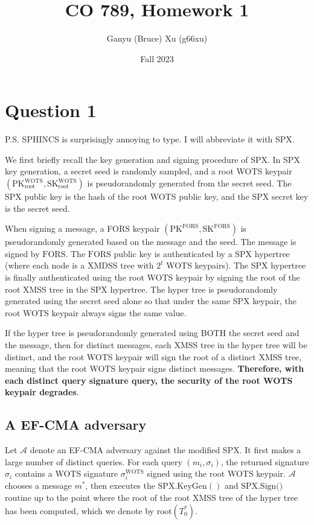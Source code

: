 \documentclass{article}
\title{CO 789, Homework 1}
\author{Ganyu (Bruce) Xu (g66xu)}
\date{Fall 2023}
\begin{document}

\section*{Question 1}
P.S. SPHINCS is surprisingly annoying to type. I will abbreviate it with SPX.

We first briefly recall the key generation and signing procedure of SPX. In SPX key generation, a secret seed is randomly sampled, and a root WOTS keypair $(\text{PK}^\text{WOTS}_\text{root}, \text{SK}^\text{WOTS}_\text{root})$ is pseudorandomly generated from the secret seed. The SPX public key is the hash of the root WOTS public key, and the SPX secret key is the secret seed.

When signing a message, a FORS keypair $(\text{PK}^\text{FORS}, \text{SK}^\text{FORS})$ is pseudorandomly generated based on the message and the seed. The message is signed by $\text{FORS}$. The $\text{FORS}$ public key is authenticated by a SPX hypertree (where each node is a XMDSS tree with $2^t$ WOTS keypairs). The SPX hypertree is finally authenticated using the root WOTS keypair by signing the root of the root XMSS tree in the SPX hypertree. The hyper tree is pseudorandomly generated using the secret seed alone so that under the same SPX keypair, the root WOTS keypair always signs the same value.

If the hyper tree is pseudorandomly generated using BOTH the secret seed and the message, then for distinct messages, each XMSS tree in the hyper tree will be distinct, and the root WOTS keypair will sign the root of a distinct XMSS tree, meaning that the root WOTS keypair signs distinct messages. \textbf{Therefore, with each distinct query signature query, the security of the root WOTS keypair degrades}.

\subsection*{A EF-CMA adversary}

Let $\mathcal{A}$ denote an EF-CMA adversary against the modified SPX. It first makes a large number of distinct queries. For each query $(m_i, \sigma_i)$, the returned signature $\sigma_i$ contains a WOTS signature $\sigma_i^\text{WOTS}$ signed using the root WOTS keypair. $\mathcal{A}$ chooses a message $m^\ast$, then executes the $\text{SPX.KeyGen}()$ and $\text{SPX.Sign()}$ routine up to the point where the root of the root XMSS tree of the hyper tree has been computed, which we denote by $\text{root}(T_0^\ast)$.
\end{document}
